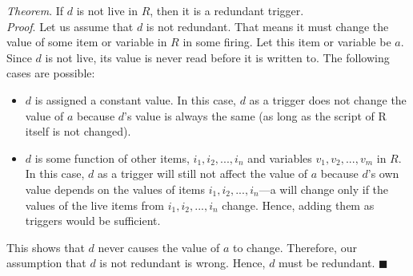 \documentclass{sig-alternate-05-2015}
\begin{document}
\begin{enumerate}
\emph{Theorem}. If $d$ is not live in $R$, then it is a redundant trigger.\\
\emph{Proof}. Let us assume that $d$ is not redundant. That means it must change the value of some item or variable in $R$ in some firing. Let this item or variable be $a$. Since $d$ is not live, its value is never read before it is written to. The following cases are possible:
\begin{itemize} [topsep=-2pt, itemsep=-1pt]
\item $d$ is assigned a constant value. In this case, $d$ as a trigger does not change the value of $a$ because $d$'s value is always the same (as long as the script of R  itself is not changed).
\item $d$ is some function of other items, $i_1, i_2, ..., i_n$ and variables $v_1, v_2, ..., v_m$ in $R$. In this case, $d$ as a trigger will still not affect the value of $a$ because $d$'s own value depends on the values of items $i_1, i_2, ..., i_n$---a will change only if the values of the live items from $i_1, i_2, ..., i_n$ change. Hence, adding them as triggers would be sufficient.
\end{itemize}
This shows that $d$ never causes the value of $a$ to change. Therefore, our assumption that $d$ is not redundant is wrong. Hence, $d$ must be redundant. $\blacksquare$
\end{enumerate}
\end{document}
